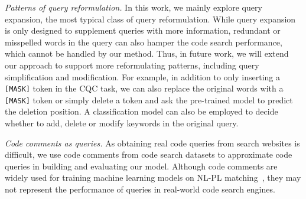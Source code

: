 \documentclass[sigconf,screen]{acmart}
\newcommand{\ie}{\hbox{i.e.}\xspace}
\newcommand{\ourmethod}{\textit{SSQR}\xspace}
\newcommand{\gu}[1]{\textcolor{blue}{[gu: #1]}}
\begin{document}



\smallskip\emph{Patterns of query reformulation.} In this work, we mainly explore query expansion, the most typical class of query reformulation. While query expansion is only designed to supplement queries with more information, redundant or misspelled words in the query can also hamper the code search performance, which cannot be handled by our method. Thus, in future work, we will extend our approach to support more reformulating patterns, including query simplification and modification. For example, in addition to only inserting a \verb|[MASK]| token in the CQC task, we can also replace the original words with a \verb|[MASK]| token or simply delete a token and ask the pre-trained model to predict the deletion position. A classification model can also be employed to decide whether to add, delete or modify keywords in the original query.


\smallskip\emph{Code comments as queries.} As obtaining real code queries from search websites is difficult, we use code comments from code search datasets to approximate code queries in building and evaluating our model. Although code comments are widely used for training machine learning models on NL-PL matching~\cite{deepcs,feng2020codebert,wang2021codet5}, they may not represent the performance of queries in real-world code search engines. 



\end{document}
